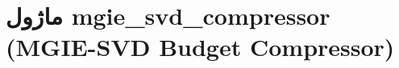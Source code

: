 \section{ماژول mgie\_svd\_compressor (MGIE-SVD Budget Compressor)}
\label{sec:module_mgie_svd_compressor}
